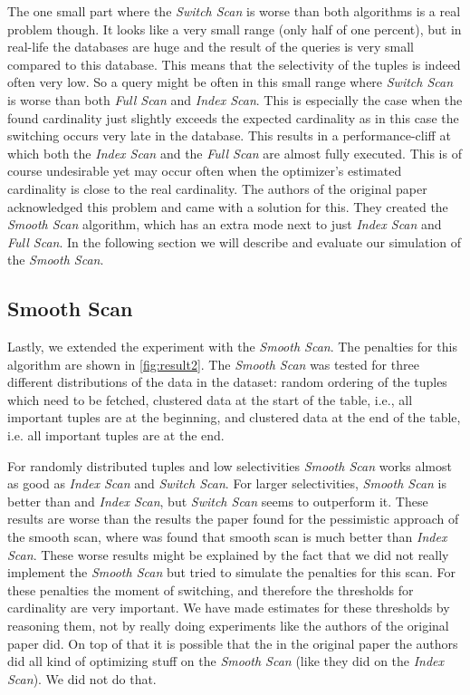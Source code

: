 \documentclass[a4paper,11pt,twoside]{article}
\begin{document}
The one small part where the \textit{Switch Scan} is worse than both algorithms is a real problem though. It looks like a very small range (only half of one percent), but in real-life the databases are huge and the result of the queries is very small compared to this database. This means that the selectivity of the tuples is indeed often very low. So a query might be often in this small range where \textit{Switch Scan} is worse than both \textit{Full Scan} and \textit{Index Scan}. This is especially the case when the found cardinality just slightly exceeds the expected cardinality as in this case the switching occurs very late in the database. This results in a performance-cliff at which both the \textit{Index Scan} and the \textit{Full Scan} are almost fully executed. This is of course undesirable yet may occur often when the optimizer's estimated cardinality is close to the real cardinality. The authors of the original paper acknowledged this problem and came with a solution for this. They created the \textit{Smooth Scan} algorithm, which has an extra mode next to just \textit{Index Scan} and \textit{Full Scan}. In the following section we will describe and evaluate our simulation of the \textit{Smooth Scan}.

\subsection{Smooth Scan}
Lastly, we extended the experiment with the \textit{Smooth Scan}. The penalties for this algorithm are shown in \autoref{fig:result2}. The \textit{Smooth Scan} was tested for three different distributions of the data in the dataset: random ordering of the tuples which need to be fetched, clustered data at the start of the table, i.e., all important tuples are at the beginning, and clustered data at the end of the table, i.e. all important tuples are at the end.

For randomly distributed tuples and low selectivities \textit{Smooth Scan} works almost as good as \textit{Index Scan} and \textit{Switch Scan}. For larger selectivities, \textit{Smooth Scan} is better than and \textit{Index Scan}, but \textit{Switch Scan} seems to outperform it. These results are worse than the results the paper found for the pessimistic approach of the smooth scan, where was found that smooth scan is much better than \textit{Index Scan}. These worse results might be explained by the fact that we did not really implement the \textit{Smooth Scan} but tried to simulate the penalties for this scan. For these penalties the moment of switching, and therefore the thresholds for cardinality are very important. We have made estimates for these thresholds by reasoning them, not by really doing experiments like the authors of the original paper did. On top of that it is possible that the in the original paper the authors did all kind of optimizing stuff on the \textit{Smooth Scan} (like they did on the \textit{Index Scan}). We did not do that.
\end{document}
